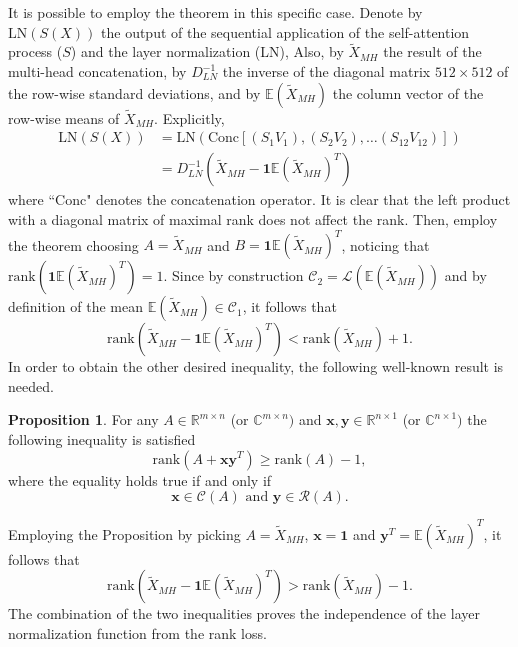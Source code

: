 \documentclass[11pt,a4paper,reqno]{amsart} %
\theoremstyle{definition}
\newtheorem{prop}[defn]{Proposition}
\numberwithin{equation}{section}          %
\begin{document}
It is possible to employ the theorem in this specific case. Denote by $\mathrm{LN}\left(S\left(X\right)\right)$ the output of the sequential application of the self-attention process ($S$) and the layer normalization (LN), Also, by $\tilde{X}_{MH}$ the result of the multi-head concatenation, by $D_{LN}^{-1}$ the inverse of the diagonal matrix $512 \times 512$ of the row-wise standard deviations, and by $\mathbb{E}(\tilde{X}_{MH})$ the column vector of the row-wise means of $\tilde{X}_{MH}$. Explicitly,
\begin{equation}
\begin{aligned}
\mathrm{LN}\left(S\left(X\right)\right) &=\mathrm{LN}\left(\mathrm{Conc}\left[(S_1 V_1), (S_2 V_2 ),  \dots  (S_{12} V_{12}) \right] \right)\\
&=D_{LN}^{-1}\left( \tilde{X}_{MH} - \mathbf{1} \mathbb{E}(\tilde{X}_{MH})^T \right)
\end{aligned} 
\end{equation}
where ``$\mathrm{Conc}$" denotes the concatenation operator. It is clear that the left product with a diagonal matrix of maximal rank does not affect the rank. Then, employ the theorem choosing $A=\tilde{X}_{MH}$ and $B=\mathbf{1} \mathbb{E}(\tilde{X}_{MH})^T$, noticing that $\mathrm{rank}(\mathbf{1} \mathbb{E}(\tilde{X}_{MH})^T)=1$. Since by construction $\mathscr{C}_2= \mathscr{L}\left(\mathbb{E}(\tilde{X}_{MH}) \right)$ and by definition of the mean $\mathbb{E}(\tilde{X}_{MH}) \in \mathscr{C}_1$, it follows that
\begin{equation}
\mathrm{rank}\left(\tilde{X}_{MH} - \mathbf{1} \mathbb{E}(\tilde{X}_{MH})^T\right) < \mathrm{rank}\left(\tilde{X}_{MH} \right) +1.
\end{equation}
In order to obtain the other desired inequality, the following well-known result is needed.
\begin{prop} \cite{bernstein2018}
For any $A \in \mathbb{R}^{m \times n}$ (or $\mathbb{C}^{m \times n})$ and $\mathbf{x,y} \in \mathbb{R}^{n \times 1}$ (or $\mathbb{C}^{n \times 1})$ the following inequality is satisfied
\begin{equation}
 \mathrm{rank}\left(A + \mathbf{x}\mathbf{y}^T \right) \geq  \mathrm{rank}(A)-1,
\end{equation}
where the equality holds true if and only if
\begin{equation}
\mathbf{x} \in \mathscr{C}(A) \text{  and  } \mathbf{y} \in \mathscr{R}(A). 
\end{equation}
\end{prop}
Employing the Proposition by picking $A=\tilde{X}_{MH}$, $\mathbf{x}=\mathbf{1}$ and $\mathbf{y}^T= \mathbb{E}(\tilde{X}_{MH})^T$, it follows that
\begin{equation}
\mathrm{rank}\left(\tilde{X}_{MH} - \mathbf{1} \mathbb{E}(\tilde{X}_{MH})^T\right) > \mathrm{rank}\left(\tilde{X}_{MH} \right) -1.
\end{equation}
The combination of the two inequalities proves the independence of the layer normalization function from the rank loss.
\end{document}
